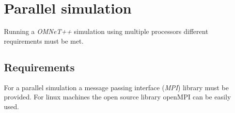 \chapter{Parallel simulation}

Running a \emph{OMNeT++} simulation using multiple processors different requirements must be met.

\section{Requirements}

For a parallel simulation a message passing interface (\emph{MPI}) library must be provided.
For linux machines the open source library openMPI can be easily used.
